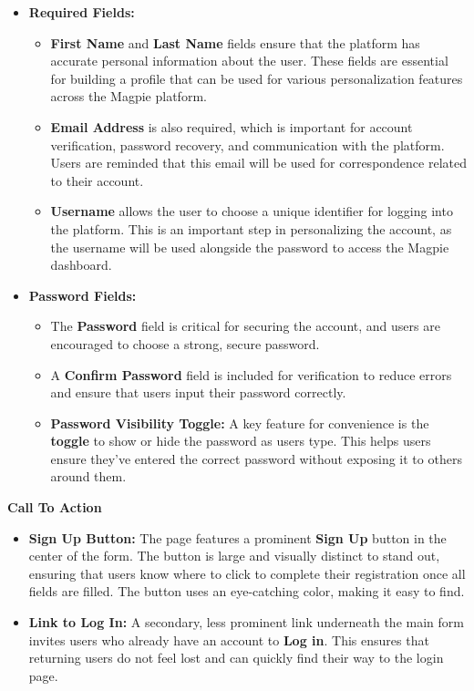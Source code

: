 \begin{itemize}
    \item{} \textbf{Required Fields:}
    \begin{itemize}
        \item{} \textbf{First Name} and \textbf{Last Name} fields ensure that the platform has accurate personal information about the user. These fields are essential for building a profile that can be used for various personalization features across the Magpie platform. 
        \item{} \textbf{Email Address} is also required, which is important for account verification, password recovery, and communication with the platform. Users are reminded that this email will be used for correspondence related to their account.
        \item{} \textbf{Username} allows the user to choose a unique identifier for logging into the platform. This is an important step in personalizing the account, as the username will be used alongside the password to access the Magpie dashboard. 
    \end{itemize}
    \item{} \textbf{Password Fields:}
    \begin{itemize}
        \item{} The \textbf{Password} field is critical for securing the account, and users are encouraged to choose a strong, secure password.
        \item{} A \textbf{Confirm Password} field is included for verification to reduce errors and ensure that users input their password correctly.
        \item{} \textbf{Password Visibility Toggle:} A key feature for convenience is the \textbf{toggle} to show or hide the password as users type. This helps users ensure they’ve entered the correct password without exposing it to others around them.
    \end{itemize}
\end{itemize}

\textbf{Call To Action}

\begin{itemize}
    \item{}  \textbf{Sign Up Button:} The page features a prominent \textbf{Sign Up} button in the center of the form. The button is large and visually distinct to stand out, ensuring that users know where to click to complete their registration once all fields are filled. The button uses an eye{-}catching color, making it easy to find.
    \item{} \textbf{Link to Log In:} A secondary, less prominent link underneath the main form invites users who already have an account to \textbf{Log in}. This ensures that returning users do not feel lost and can quickly find their way to the login page.
\end{itemize}

